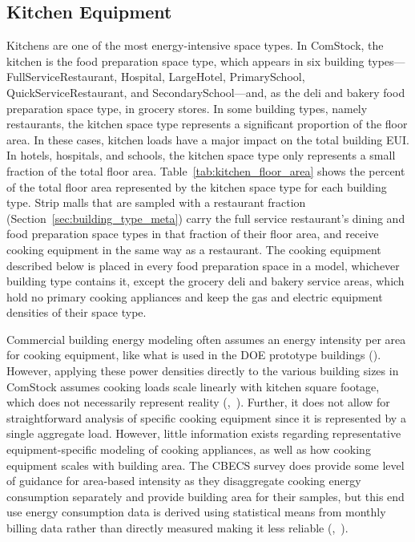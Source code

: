 \subsection{Kitchen Equipment}
\label{sec:kitchen_equipment}
Kitchens are one of the most energy-intensive space types. In ComStock, the kitchen is the food preparation space type, which appears in six building types---FullServiceRestaurant, Hospital, LargeHotel, PrimarySchool, QuickServiceRestaurant, and SecondarySchool---and, as the deli and bakery food preparation space type, in grocery stores. In some building types, namely restaurants, the kitchen space type represents a significant proportion of the floor area. In these cases, kitchen loads have a major impact on the total building EUI. In hotels, hospitals, and schools, the kitchen space type only represents a small fraction of the total floor area. Table~\ref{tab:kitchen_floor_area} shows the percent of the total floor area represented by the kitchen space type for each building type. Strip malls that are sampled with a restaurant fraction (Section~\ref{sec:building_type_meta}) carry the full service restaurant's dining and food preparation space types in that fraction of their floor area, and receive cooking equipment in the same way as a restaurant. The cooking equipment described below is placed in every food preparation space in a model, whichever building type contains it, except the grocery deli and bakery service areas, which hold no primary cooking appliances and keep the gas and electric equipment densities of their space type.



Commercial building energy modeling often assumes an energy intensity per area for cooking equipment, like what is used in the DOE prototype buildings (\cite{qsr_50pct_svs}). However, applying these power densities directly to the various building sizes in ComStock assumes cooking loads scale linearly with kitchen square footage, which does not necessarily represent reality (\cite{eia2012cbecs},~\cite{qsr_50pct_svs}). Further, it does not allow for straightforward analysis of specific cooking equipment since it is represented by a single aggregate load. However, little information exists regarding representative equipment-specific modeling of cooking appliances, as well as how cooking equipment scales with building area. The CBECS survey does provide some level of guidance for area-based intensity as they disaggregate cooking energy consumption separately and provide building area for their samples, but this end use energy consumption data is derived using statistical means from monthly billing data rather than directly measured making it less reliable (\cite{eia2012cbecs},~\cite{qsr_50pct_svs}).


